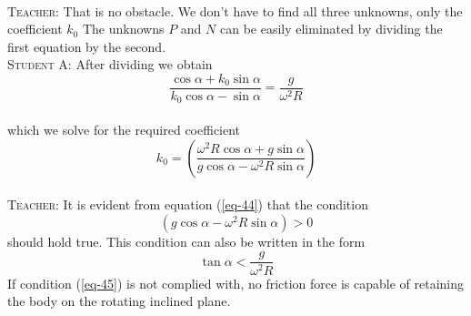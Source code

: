 \documentclass[a4paper,sfsidenotes]{tufte-book}
\begin{document}
\\
\textsc{Teacher:} That is no obstacle. We don't have to find all three
unknowns, only the coefficient $k_{0}$ The unknowns $P$ and $N$ can be easily eliminated by dividing the first equation by the second.
\\
\textsc{Student A:} After dividing we obtain
\begin{equation*}
\frac{\cos \alpha+ k_{0} \sin \alpha}{k_{0} \cos \alpha - \sin \alpha} = \frac{g}{\omega^{2}R}
\end{equation*}
\\
which we solve for the required coefficient
\begin{equation}
k_{0} =\left( \frac{\omega^{2}R \cos \alpha+g \sin \alpha}{g \cos \alpha- \omega^{2} R \sin \alpha} \right)
\label{eq-44}
\end{equation}
\\
\textsc{Teacher:} It is evident from equation (\ref{eq-44}) that the condition 
\begin{equation*}
\left( g \cos \alpha- \omega^{2}R \sin \alpha \right) >0
\end{equation*}
should hold true. This condition can also be written in the form
\begin{equation}
\tan \alpha < \frac{g}{\omega^{2}R}
\label{eq-45}
\end{equation}
If condition (\ref{eq-45}) is not complied with, no friction force is capable of retaining the body on the rotating inclined plane.
\\
\end{document}
